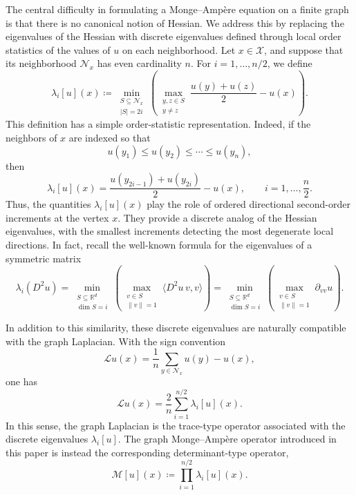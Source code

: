 \documentclass[reqno,11pt]{amsart}
\numberwithin{equation}{section}
\theoremstyle{definition}
\theoremstyle{remark}
\begin{document}
The central difficulty in formulating a Monge--Amp\`ere equation on a finite graph is that there is no canonical notion of Hessian. We address this by replacing the eigenvalues of the Hessian with discrete eigenvalues defined through local order statistics of the values of \(u\) on each neighborhood. Let \(x\in \mathcal X\), and suppose that its neighborhood \(\mathcal N_x\) has even cardinality \(n\). For \(i=1,\dots,n/2\), we define
\[
    \lambda_i[u](x)
    \coloneqq
    \min_{\substack{S\subseteq \mathcal N_x\\ |S|=2i}}
    \left(
        \max_{\substack{y,z\in S\\ y\neq z}}
        \frac{u(y)+u(z)}{2}
        -u(x)
    \right).
\]
This definition has a simple order-statistic representation. Indeed, if the neighbors of \(x\) are indexed so that
\[
    u(y_1)\leq u(y_2)\leq \cdots \leq u(y_n),
\]
then
\[
    \lambda_i[u](x)
    =
    \frac{u(y_{2i-1})+u(y_{2i})}{2}-u(x),
    \qquad i=1,\dots,\frac n2 .
\]
Thus, the quantities \(\lambda_i[u](x)\) play the role of ordered directional second-order increments at the vertex \(x\). They provide a discrete analog of the Hessian eigenvalues, with the smallest increments detecting the most degenerate local directions. In fact, recall the well-known formula for the eigenvalues of a symmetric matrix
$$
\lambda_i (D^2 u) = 
\min_{\substack{S\subseteq \mathbb{R}^d \\ \dim S=i}}
    \left(
        \max_{\substack{v\in S \\ \| v \| =1}}
        \langle D^2 u \, v , v \rangle
    \right)
    = 
\min_{\substack{S\subseteq \mathbb{R}^d \\ \dim S=i}}
    \left(
        \max_{\substack{v\in S \\ \| v \| =1}}
        \partial_{vv} u
    \right).
$$

In addition to this similarity, these discrete eigenvalues are naturally compatible with the graph Laplacian. With the sign convention
\[
    \mathcal L u(x)
    =
    \frac{1}{n}\sum_{y\in \mathcal N_x}u(y)-u(x),
\]
one has
\[
    \mathcal L u(x)
    =
    \frac{2}{n}\sum_{i=1}^{n/2}\lambda_i[u](x).
\]
In this sense, the graph Laplacian is the trace-type operator associated with the discrete eigenvalues \(\lambda_i[u]\). The graph Monge--Amp\`ere operator introduced in this paper is instead the corresponding determinant-type operator,
\[
    \mathcal M [u](x)
    \coloneqq
    \prod_{i=1}^{n/2}\lambda_i[u](x).
\]
\end{document}
